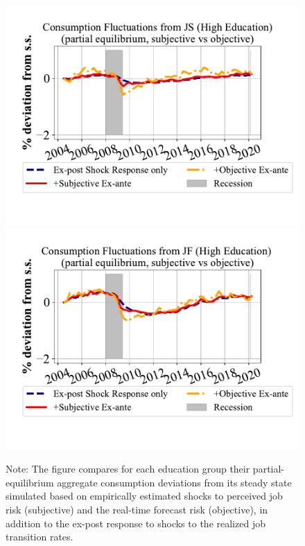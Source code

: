 \begin{figure}
\includegraphics[width=0.4\linewidth]{Figures/consumption_pe_JS_deviation_machine_as_rational_HighEdu.pdf}
\includegraphics[width=0.4\linewidth]{Figures/consumption_pe_JF_deviation_machine_as_rational_HighEdu.pdf}
      \begin{flushleft}\footnotesize {Note: The figure compares for each education group their partial-equilibrium aggregate consumption deviations from its steady state simulated based on empirically estimated shocks to perceived job risk (subjective) and the real-time forecast risk (objective), in addition to the ex-post response to shocks to the realized job transition rates.} \end{flushleft}
    \end{figure}


